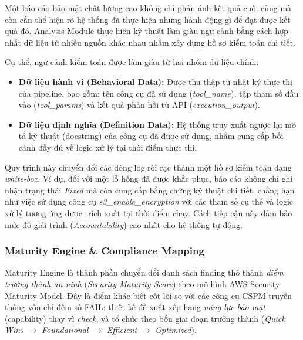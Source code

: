 Một báo cáo bảo mật chất lượng cao không chỉ phản ánh kết quả cuối cùng mà còn cần thể hiện rõ hệ thống đã thực hiện những hành động gì để đạt được kết quả đó. Analysis Module thực hiện kỹ thuật làm giàu ngữ cảnh bằng cách hợp nhất dữ liệu từ nhiều nguồn khác nhau nhằm xây dựng hồ sơ kiểm toán chi tiết.

Cụ thể, ngữ cảnh kiểm toán được làm giàu từ hai nhóm dữ liệu chính:
\begin{itemize}
  \item \textbf{Dữ liệu hành vi (Behavioral Data):}
    Được thu thập
    từ nhật ký thực thi
    của pipeline,
    bao gồm:
    tên công cụ đã sử dụng
    (\textit{tool\_name}),
    tập tham số đầu vào
    (\textit{tool\_params})
    và kết quả phản hồi
    từ API
    (\textit{execution\_output}).

  \item \textbf{Dữ liệu định nghĩa (Definition Data):}
    Hệ thống truy xuất
    ngược lại
    mô tả kỹ thuật
    (docstring)
    của công cụ
    đã được sử dụng,
    nhằm cung cấp
    bối cảnh đầy đủ
    về logic xử lý
    tại thời điểm thực thi.
\end{itemize}

Quy trình này chuyển đổi các dòng log rời rạc thành một hồ sơ kiểm toán dạng \textit{white-box}. Ví dụ, đối với một lỗ hổng đã được khắc phục, báo cáo không chỉ ghi nhận trạng thái \textit{Fixed} mà còn cung cấp bằng chứng kỹ thuật chi tiết, chẳng hạn như việc sử dụng công cụ \textit{s3\_enable\_encryption} với các tham số cụ thể và logic xử lý tương ứng được trích xuất tại thời điểm chạy. Cách tiếp cận này đảm bảo mức độ giải trình (\textit{Accountability}) cao nhất cho hệ thống tự động.

\subsubsection*{Maturity Engine \& Compliance Mapping}
\label{subsec:maturity_engine}

Maturity Engine là thành phần chuyển đổi danh sách finding thô thành \textit{điểm trưởng thành an ninh} (\textit{Security Maturity Score}) theo mô hình AWS Security Maturity Model. Đây là điểm khác biệt cốt lõi so với các công cụ CSPM truyền thống vốn chỉ đếm số FAIL: thiết kế đề xuất xếp hạng \textit{năng lực bảo mật} (capability) thay vì \textit{check}, và tổ chức theo bốn giai đoạn trưởng thành (\textit{Quick Wins} $\rightarrow$ \textit{Foundational} $\rightarrow$ \textit{Efficient} $\rightarrow$ \textit{Optimized}).

